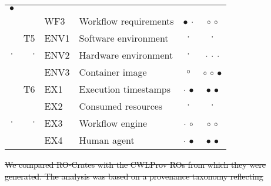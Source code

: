 \documentclass[10pt,letterpaper]{article}
\providecommand{\DIFaddtex}[1]{{\protect\color{blue}\uwave{#1}}} %
\providecommand{\DIFdeltex}[1]{{\protect\color{red}\sout{#1}}}                      %
\providecommand{\DIFaddFL}[1]{\DIFadd{#1}} %
\providecommand{\DIFdelFL}[1]{\DIFdel{#1}} %
\providecommand{\DIFaddbeginFL}{} %
\providecommand{\DIFaddendFL}{} %
\providecommand{\DIFdelbeginFL}{} %
\providecommand{\DIFdelendFL}{} %
\providecommand{\DIFadd}[1]{\texorpdfstring{\DIFaddtex{#1}}{#1}} %
\providecommand{\DIFdel}[1]{\texorpdfstring{\DIFdeltex{#1}}{}} %
\newcommand{\DIFscaledelfig}{0.5}
\newlength{\DIFdelgraphicswidth} %
\newlength{\DIFdelgraphicsheight} %
\newcommand{\DIFaddincludegraphics}[2][]{{\color{blue}\fbox{\DIFOincludegraphics[#1]{#2}}}} %
\newcommand{\DIFdelincludegraphics}[2][]{%
\sbox{\DIFdelgraphicsbox}{\DIFOincludegraphics[#1]{#2}}%
\settoboxwidth{\DIFdelgraphicswidth}{\DIFdelgraphicsbox} %
\settoboxtotalheight{\DIFdelgraphicsheight}{\DIFdelgraphicsbox} %
\scalebox{\DIFscaledelfig}{%
\parbox[b]{\DIFdelgraphicswidth}{\usebox{\DIFdelgraphicsbox}\\[-\baselineskip] \rule{\DIFdelgraphicswidth}{0em}}\llap{\resizebox{\DIFdelgraphicswidth}{\DIFdelgraphicsheight}{%
\setlength{\unitlength}{\DIFdelgraphicswidth}%
\begin{picture}(1,1)%
\thicklines\linethickness{2pt} %
{\color[rgb]{1,0,0}\put(0,0){\framebox(1,1){}}}%
{\color[rgb]{1,0,0}\put(0,0){\line( 1,1){1}}}%
{\color[rgb]{1,0,0}\put(0,1){\line(1,-1){1}}}%
\end{picture}%
}\hspace*{3pt}}} %
} %
\DeclareRobustCommand{\DIFaddbeginFL}{\DIFOaddbeginFL \let\includegraphics\DIFaddincludegraphics} %
\DeclareRobustCommand{\DIFaddendFL}{\DIFOaddendFL \let\includegraphics\DIFOincludegraphics} %
\DeclareRobustCommand{\DIFdelbeginFL}{\DIFOdelbeginFL \let\includegraphics\DIFdelincludegraphics} %
\DeclareRobustCommand{\DIFdelendFL}{\DIFOaddendFL \let\includegraphics\DIFOincludegraphics} %
\begin{document}
\begin{table}[ht]
\begin{adjustwidth}{-5cm}{0in}
\begin{tabular}{c|r|l|l|c|c}
\DIFdelFL{$\bullet$ }\DIFdelendFL \\ 
\DIFaddbeginFL \DIFaddFL{$\bullet$ }\DIFaddendFL & \DIFaddbeginFL & \DIFaddendFL WF3 & Workflow requirements   &  \DIFdelbeginFL \DIFdelFL{$\bullet$ }%
\DIFdelendFL $\cdot$  &  $\circ$  \DIFdelbeginFL %
\DIFdelFL{$\circ$ }\DIFdelendFL \\ \hline 
\DIFaddbeginFL \DIFaddFL{$\cdot$ }& \DIFaddendFL T5 & ENV1 & Software environment & $\cdot$ &  $\cdot$  \DIFdelbeginFL %
\DIFdelendFL \DIFaddbeginFL \\ 
\DIFaddendFL $\cdot$ & \DIFdelbeginFL \DIFdelFL{$\cdot$ }%
\DIFdelendFL & ENV2 & Hardware environment   & $\cdot$ &  $\cdot$  \DIFdelbeginFL %
\DIFdelFL{$\cdot$  }%
\DIFdelFL{$\cdot$}\DIFdelendFL \\ 
\DIFaddbeginFL \DIFaddFL{$\circ$ }\DIFaddendFL & \DIFaddbeginFL & \DIFaddendFL ENV3 & Container image        & $\circ$ &  $\circ$  \DIFdelbeginFL %
\DIFdelFL{$\circ$ }%
\DIFdelFL{$\bullet$ }\DIFdelendFL \\ \hline 
\DIFaddbeginFL \DIFaddFL{$\cdot$ }& \DIFaddendFL T6 & EX1 & Execution timestamps & \DIFdelbeginFL \DIFdelFL{$\cdot$ }%
\DIFdelendFL $\bullet$ & $\bullet$ \DIFdelbeginFL %
\DIFdelFL{$\bullet$ }\DIFdelendFL \\ 
\DIFaddbeginFL \DIFaddFL{$\cdot$ }\DIFaddendFL & \DIFaddbeginFL & \DIFaddendFL EX2 & Consumed resources      &  $\cdot$ & $\cdot$  \DIFdelbeginFL %
\DIFdelendFL \DIFaddbeginFL \\ 
\DIFaddendFL $\cdot$ & \DIFdelbeginFL \DIFdelFL{$\cdot$  }%
\DIFdelendFL & EX3 & Workflow engine         & \DIFdelbeginFL \DIFdelFL{$\cdot$ }%
\DIFdelendFL $\circ$ & $\circ$  \DIFdelbeginFL %
\DIFdelFL{$\circ$  }\DIFdelendFL \\  
\DIFaddbeginFL \DIFaddFL{$\cdot$ }\DIFaddendFL & \DIFaddbeginFL & \DIFaddendFL EX4 & Human agent             & \DIFdelbeginFL \DIFdelFL{$\cdot$ }%
\DIFdelendFL $\bullet$ & $\bullet$  \DIFdelbeginFL %
\DIFdelFL{$\bullet$ }\DIFdelendFL \\ \hline
\end{tabular}
\begin{flushleft}
\DIFdelbeginFL \DIFdelFL{We compared RO-Crates with the CWLProv ROs from which they were generated. The analysis was based on a provenance taxonomy reflecting }\DIFdelendFL %

\end{flushleft}
\end{adjustwidth}
\end{table}
\end{document}
